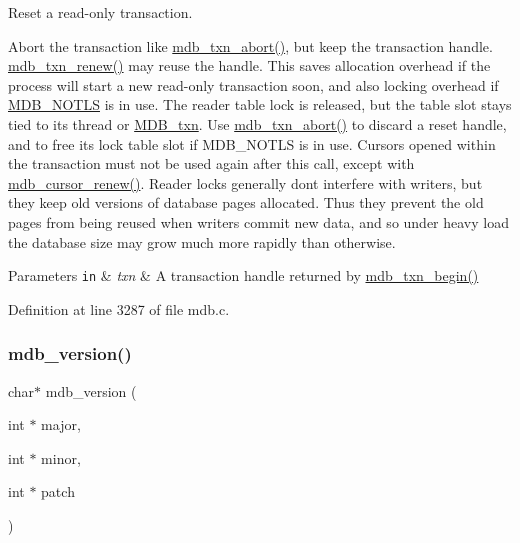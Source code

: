 Reset a read-\/only transaction. 

Abort the transaction like \mbox{\hyperlink{group__mdb_ga73a5938ae4c3239ee11efa07eb22b882}{mdb\+\_\+txn\+\_\+abort()}}, but keep the transaction handle. \mbox{\hyperlink{group__mdb_ga6c6f917959517ede1c504cf7c720ce6d}{mdb\+\_\+txn\+\_\+renew()}} may reuse the handle. This saves allocation overhead if the process will start a new read-\/only transaction soon, and also locking overhead if \mbox{\hyperlink{group__mdb__env_ga5dca84a576d14b4bfe2deddc2dc622d3}{M\+D\+B\+\_\+\+N\+O\+T\+LS}} is in use. The reader table lock is released, but the table slot stays tied to its thread or \mbox{\hyperlink{struct_m_d_b__txn}{M\+D\+B\+\_\+txn}}. Use \mbox{\hyperlink{group__mdb_ga73a5938ae4c3239ee11efa07eb22b882}{mdb\+\_\+txn\+\_\+abort()}} to discard a reset handle, and to free its lock table slot if M\+D\+B\+\_\+\+N\+O\+T\+LS is in use. Cursors opened within the transaction must not be used again after this call, except with \mbox{\hyperlink{group__mdb_gac8b57befb68793070c85ea813df481af}{mdb\+\_\+cursor\+\_\+renew()}}. Reader locks generally don\textquotesingle{}t interfere with writers, but they keep old versions of database pages allocated. Thus they prevent the old pages from being reused when writers commit new data, and so under heavy load the database size may grow much more rapidly than otherwise. 
\begin{DoxyParams}[1]{Parameters}
\mbox{\tt in}  & {\em txn} & A transaction handle returned by \mbox{\hyperlink{group__mdb_gad7ea55da06b77513609efebd44b26920}{mdb\+\_\+txn\+\_\+begin()}} \\
\hline
\end{DoxyParams}


Definition at line 3287 of file mdb.\+c.

\mbox{\label{group__mdb_ga0e5d7298fc39b3c187fffbe30264c968}} 
\subsubsection{\texorpdfstring{mdb\+\_\+version()}{mdb\_version()}}
{\footnotesize\ttfamily char$\ast$ mdb\+\_\+version (\begin{DoxyParamCaption}\item[{int $\ast$}]{major,  }\item[{int $\ast$}]{minor,  }\item[{int $\ast$}]{patch }\end{DoxyParamCaption})}




